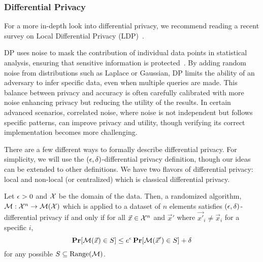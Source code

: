 \documentclass[11pt]{article}
\begin{document}
\subsubsection*{Differential Privacy}
For a more in-depth look into differential privacy, we recommend reading a recent survey on Local Differential Privacy (LDP)~\cite{yang2023local}.

DP uses noise to mask the contribution of individual data points in statistical analysis, ensuring that sensitive information is protected~\cite{dwork2006differential}. 
By adding random noise from distributions such as Laplace or Gaussian, DP limits the ability of an adversary to infer specific data, even when multiple queries are made. 
This balance between privacy and accuracy is often carefully calibrated with more noise enhancing privacy but reducing the utility of the results. 
In certain advanced scenarios, correlated noise, where noise is not independent but follows specific patterns, can improve privacy and utility, though verifying its correct implementation becomes more challenging.

There are a few different ways to formally describe differential privacy.
For simplicity, we will use the $(\epsilon, \delta)$-differential privacy definition, though our ideas can be extended to other definitions.
We have two flavors of differential privacy: local and non-local (or centralized) which is classical differential privacy.


\begin{definition}
	Let $\epsilon > 0$ and $\mathcal{X}$ be the domain of the data.
	Then, a randomized algorithm, $\mathcal{M} : \mathcal{X}^n \rightarrow \mathcal{M}(\mathcal{X})$ which is applied to a dataset of $n$ elements satisfies $(\epsilon, \delta)$-differential privacy if and only if for all $\vec{x} \in \mathcal{X}^n$ and $\vec{x}'$ where $\vec{x'}_i \neq \vec{x}_i$ for a specific $i$,
	\[
		\operatorname*{\mathbf{Pr}}[\mathcal{M}(\vec{x}) \in S] \leq e^\epsilon \operatorname*{\mathbf{Pr}}[\mathcal{M}(\vec{x}') \in S] + \delta
	\]
	for any possible $S \subseteq \text{Range}(\mathcal{M})$.
\end{definition}
\end{document}
